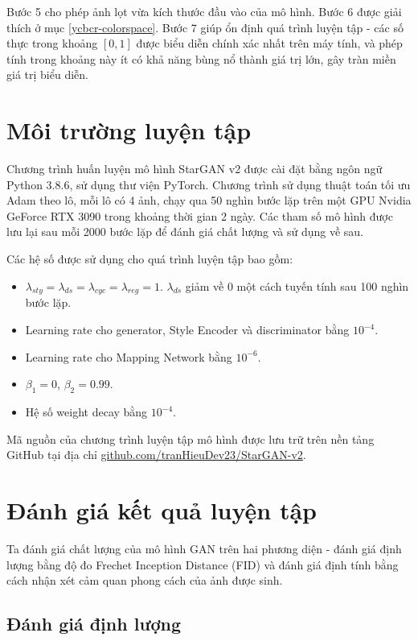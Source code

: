 \documentclass[12pt]{extreport}
\begin{document}
Bước 5 cho phép ảnh lọt vừa kích thước đầu vào của mô hình. Bước 6 được giải thích ở mục \ref{ycbcr-colorspace}. Bước 7 giúp ổn định quá trình luyện tập - các số thực trong khoảng $ [0, 1] $ được biểu diễn chính xác nhất trên máy tính, và phép tính trong khoảng này ít có khả năng bùng nổ thành giá trị lớn, gây tràn miền giá trị biểu diễn.

\section{Môi trường luyện tập}

Chương trình huấn luyện mô hình StarGAN v2 được cài đặt bằng ngôn ngữ Python 3.8.6, sử dụng thư viện PyTorch. Chương trình sử dụng thuật toán tối ưu Adam theo lô, mỗi lô có 4 ảnh, chạy qua 50 nghìn bước lặp trên một GPU Nvidia GeForce RTX 3090 trong khoảng thời gian 2 ngày. Các tham số mô hình được lưu lại sau mỗi 2000 bước lặp để đánh giá chất lượng và sử dụng về sau.

Các hệ số được sử dụng cho quá trình luyện tập bao gồm:
\begin{itemize}
    \item $ \lambda_{sty} = \lambda_{ds} = \lambda_{cyc} = \lambda_{reg} = 1 $. $ \lambda_{ds} $ giảm về 0 một cách tuyến tính sau 100 nghìn bước lặp.
    \item Learning rate cho generator, Style Encoder và discriminator bằng $ 10^{-4} $.
    \item Learning rate cho Mapping Network bằng $ 10^{-6} $.
    \item $ \beta_1 = 0 $, $ \beta_2 = 0.99 $.
    \item Hệ số weight decay bằng $ 10^{-4} $.
\end{itemize}

Mã nguồn của chương trình luyện tập mô hình được lưu trữ trên nền tảng GitHub tại địa chỉ \href{https://github.com/tranHieuDev23/StarGAN-v2}{github.com/tranHieuDev23/StarGAN-v2}.

\section{Đánh giá kết quả luyện tập}

Ta đánh giá chất lượng của mô hình GAN trên hai phương diện - đánh giá định lượng bằng độ đo Frechet Inception Distance (FID) và đánh giá định tính bằng cách nhận xét cảm quan phong cách của ảnh được sinh.

\subsection{Đánh giá định lượng}
\end{document}
